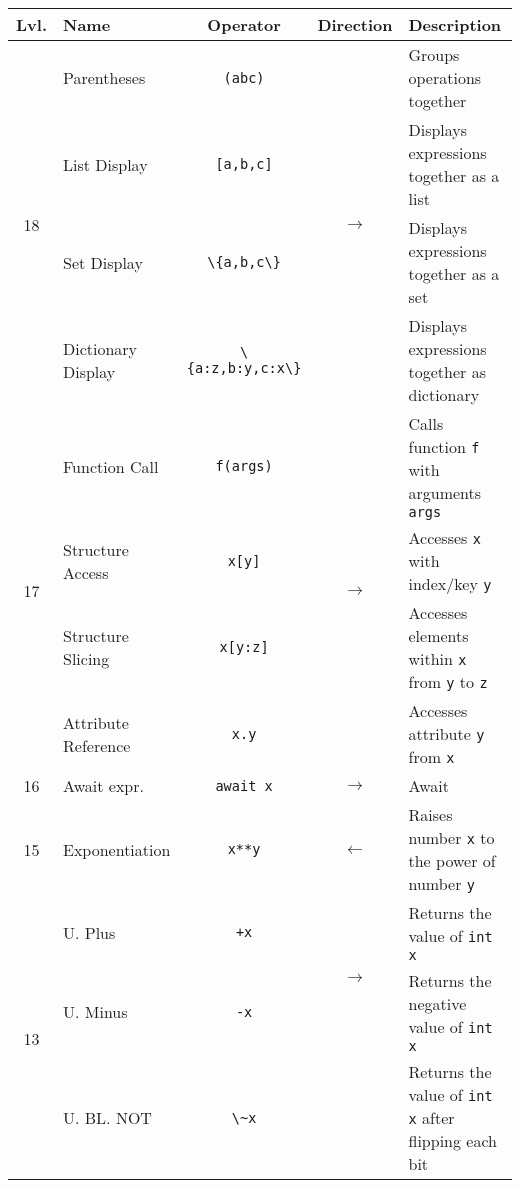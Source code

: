 \documentclass{article}
\begin{document}
\begin{center}\begin{tabularx}{\textwidth}{clccX}\toprule
  Lvl. & \quad Name & Operator & Direction &\qquad Description \\\midrule
  \multirow{4}{*}{18} & Parentheses & \lstinline|(abc)| & \multirow{4}{*}{\(\to\)} & Groups operations together \\
                      & List Display & \lstinline|[a,b,c]| & & Displays expressions together as a list\\
                      & Set Display & \lstinline|\{a,b,c\}| & & Displays expressions together as a set\\
                      & Dictionary Display & \lstinline|\{a:z,b:y,c:x\}| & & Displays expressions together as dictionary\\\midrule
  \multirow{4}{*}{17} & Function Call & \lstinline|f(args)| & \multirow{4}{*}{\(\to\)} & Calls function \lstinline|f| with arguments \lstinline|args|\\
                      & Structure Access & \lstinline|x[y]| & & Accesses \lstinline|x| with index/key \lstinline|y|\\
                      & Structure Slicing & \lstinline|x[y:z]| & & Accesses elements within \lstinline|x| from \lstinline|y| to \lstinline|z|\\
                      & Attribute Reference & \lstinline|x.y| & & Accesses attribute \lstinline|y| from \lstinline|x|\\\midrule
  16 & Await expr. & \lstinline|await x| & \(\to\) & Await\\\midrule
  15 & Exponentiation & \lstinline|x**y| & \(\gets\) & Raises number \lstinline|x| to the power of number \lstinline|y|\\\midrule
  \multirow{3}{*}{13} & U. Plus & \lstinline|+x| & \multirow{2}{*}{\(\to\)} & Returns the value of \lstinline|int x|\\
                      & U. Minus          & \lstinline|-x|  & & Returns the negative value of \lstinline|int x|\\
                      & U. BL. NOT        & \lstinline|\~x| & & Returns the value of \lstinline|int x| after flipping each bit\\\midrule

\end{tabularx}\end{center}
\end{document}
